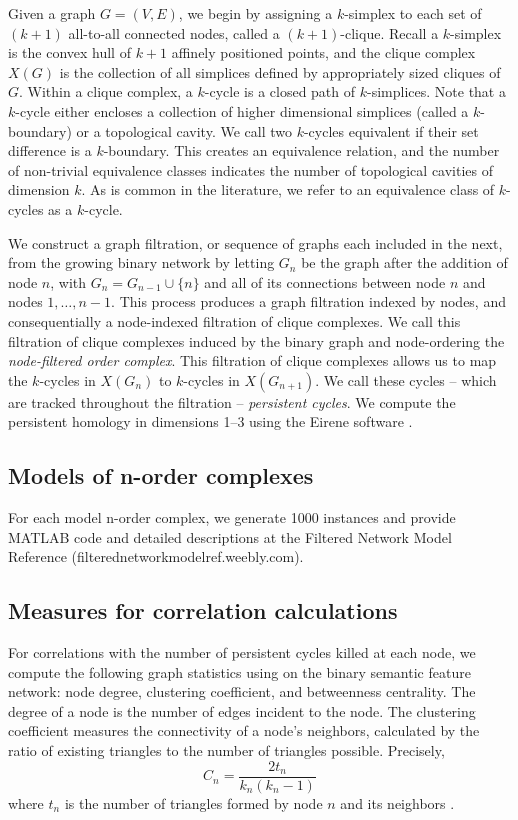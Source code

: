 \documentclass{article}
\begin{document}
Given a graph $G = (V,E)$, we begin by assigning a $k$-simplex to each set of $(k+1)$ all-to-all connected nodes, called a $(k+1)$-clique. Recall a $k$-simplex is the convex hull of $k+1$ affinely positioned points, and the clique complex $X(G)$ is the collection of all simplices defined by appropriately sized cliques of $G$. Within a clique complex, a $k$-cycle is a closed path of $k$-simplices. Note that a $k$-cycle either encloses a collection of higher dimensional simplices (called a $k$-boundary) or a topological cavity. We call two $k$-cycles equivalent if their set difference is a $k$-boundary. This creates an equivalence relation, and the number of non-trivial equivalence classes indicates the number of topological cavities of dimension $k$. As is common in the literature, we refer to an equivalence class of $k$-cycles as a $k$-cycle.

We construct a graph filtration, or sequence of graphs each included in the next, from the growing binary network by letting $G_n$ be the graph after the addition of node $n$, with $G_n = G_{n-1} \cup \{n\}$ and all of its connections between node $n$ and nodes $1,\dots, n-1$. This process produces a graph filtration indexed by nodes, and consequentially a node-indexed filtration of clique complexes. We call this filtration of clique complexes induced by the binary graph and node-ordering the \emph{node-filtered order complex}. This filtration of clique complexes allows us to map the $k$-cycles in $X(G_n)$ to $k$-cycles in $X(G_{n+1})$. We call these cycles -- which are tracked throughout the filtration -- \emph{persistent cycles}. We compute the persistent homology \cite{carlsson2009topology,zomorodian2005computing} in dimensions 1--3 using the Eirene software \cite{henselmanghrist16}.


\subsection*{Models of n-order complexes}
For each model n-order complex, we generate 1000 instances and provide MATLAB code and detailed descriptions at the Filtered Network Model Reference (filterednetworkmodelref.weebly.com).

\subsection*{Measures for correlation calculations}
For correlations with the number of persistent cycles killed at each node, we compute the following graph statistics using \cite{rubinov2010complex} on the binary semantic feature network: node degree, clustering coefficient, and betweenness centrality. The degree of a node is the number of edges incident to the node. The clustering coefficient measures the connectivity of a node's neighbors, calculated by the ratio of existing triangles to the number of triangles possible. Precisely,
\begin{equation}
C_n = \frac{2t_n}{k_n(k_n -1)}
\end{equation}
where $t_n$ is the number of triangles formed by node $n$ and its neighbors \cite{watts1998collective}.
\end{document}
